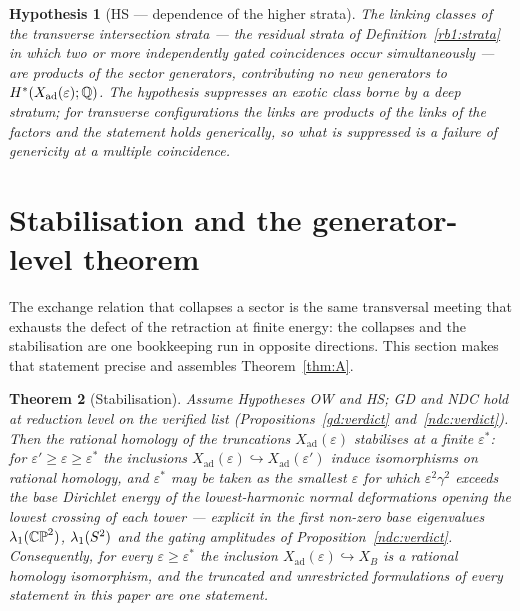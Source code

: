 \documentclass[11pt]{article}
\numberwithin{equation}{section}
\theoremstyle{plain}
\newtheorem{theorem}{Theorem}[section]
\newtheorem{hypothesis}[theorem]{Hypothesis}
\theoremstyle{definition}
\theoremstyle{remark}
\newcommand{\Xad}{X_{\mathrm{ad}}}
\begin{document}
\begin{hypothesis}[HS --- dependence of the higher
strata]\label{hyp:hs}
The linking classes of the transverse intersection strata --- the
residual strata of Definition~\textup{\ref{rb1:strata}} in which
two or more independently gated coincidences occur simultaneously
--- are products of the sector generators, contributing no new
generators to $H^{*}(\Xad(\varepsilon); \Q)$. The hypothesis
suppresses an exotic class borne by a deep stratum; for transverse
configurations the links are products of the links of the factors
and the statement holds generically, so what is suppressed is a
failure of genericity at a multiple coincidence.
\end{hypothesis}

\section{Stabilisation and the generator-level
theorem}\label{sec:stab}

The exchange relation that collapses a sector is the same
transversal meeting that exhausts the defect of the retraction at
finite energy: the collapses and the stabilisation are one
bookkeeping run in opposite directions. This section makes that
statement precise and assembles Theorem~\ref{thm:A}.

\begin{theorem}[Stabilisation]\label{rb2:stab}
Assume Hypotheses \textup{OW} and \textup{HS}; GD and NDC hold at
reduction level on the verified list
\textup{(Propositions~\ref{gd:verdict} and~\ref{ndc:verdict})}.
Then the rational
homology of the truncations $\Xad(\varepsilon)$ stabilises at a
finite $\varepsilon^{*}$: for
$\varepsilon' \geq \varepsilon \geq \varepsilon^{*}$ the inclusions
$\Xad(\varepsilon) \hookrightarrow \Xad(\varepsilon')$ induce
isomorphisms on rational homology, and $\varepsilon^{*}$ may be
taken as the smallest $\varepsilon$ for which
$\varepsilon^{2}\gamma^{2}$ exceeds the base Dirichlet energy of
the lowest-harmonic normal deformations opening the lowest crossing
of each tower --- explicit in the first non-zero base eigenvalues
$\lambda_{1}(\mathbb{CP}^2)$, $\lambda_{1}(S^2)$ and the gating
amplitudes of Proposition~\textup{\ref{ndc:verdict}}. Consequently,
for every $\varepsilon \geq \varepsilon^{*}$ the inclusion
$\Xad(\varepsilon) \hookrightarrow X_{B}$ is a rational homology
isomorphism, and the truncated and unrestricted formulations of
every statement in this paper are one statement.
\end{theorem}
\end{document}
